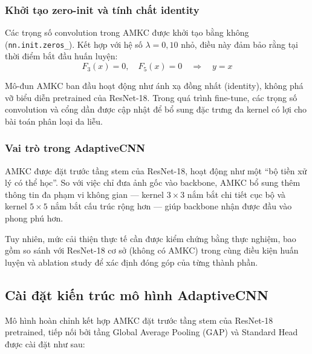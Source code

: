 \subsubsection{Khởi tạo zero-init và tính chất identity}

Các trọng số convolution trong AMKC được khởi tạo bằng không (\texttt{nn.init.zeros\_}). Kết hợp với hệ số $\lambda=0{,}10$ nhỏ, điều này đảm bảo rằng tại thời điểm bắt đầu huấn luyện:
\begin{equation}
  F_3(x)=0, \quad F_5(x)=0 \quad \Rightarrow \quad y=x
\end{equation}

Mô-đun AMKC ban đầu hoạt động như ánh xạ đồng nhất (identity), không phá vỡ biểu diễn pretrained của ResNet-18. Trong quá trình fine-tune, các trọng số convolution và cổng dần được cập nhật để bổ sung đặc trưng đa kernel có lợi cho bài toán phân loại da liễu.

\subsubsection{Vai trò trong AdaptiveCNN}

AMKC được đặt trước tầng stem của ResNet-18, hoạt động như một ``bộ tiền xử lý có thể học''. So với việc chỉ đưa ảnh gốc vào backbone, AMKC bổ sung thêm thông tin đa phạm vi không gian --- kernel $3\times3$ nắm bắt chi tiết cục bộ và kernel $5\times5$ nắm bắt cấu trúc rộng hơn --- giúp backbone nhận được đầu vào phong phú hơn.

Tuy nhiên, mức cải thiện thực tế cần được kiểm chứng bằng thực nghiệm, bao gồm so sánh với ResNet-18 cơ sở (không có AMKC) trong cùng điều kiện huấn luyện và ablation study để xác định đóng góp của từng thành phần.

\subsection{Cài đặt kiến trúc mô hình AdaptiveCNN}
Mô hình hoàn chỉnh kết hợp AMKC đặt trước tầng stem của ResNet-18 pretrained, tiếp nối bởi tầng Global Average Pooling (GAP) và Standard Head được cài đặt như sau:


